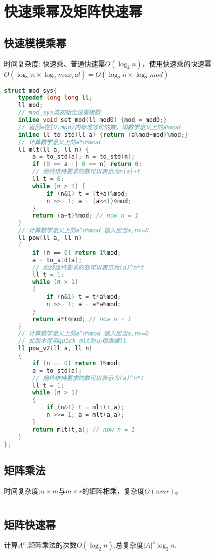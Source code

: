 \section{快速乘幂及矩阵快速幂}
    \subsection{快速模模乘幂}
        \par 时间复杂度: 快速乘、普通快速幂$O(\log_2{n})$，使用快速乘的快速幂$O(\log_2{n} \times \log_2{max_val})=O(\log_2{n} \times \log_2{mod})$
        \begin{lstlisting}[language={c++}]
struct mod_sys{
    typedef long long ll;
    ll mod;
    // mod_sys类初始化设置模数
    inline void set_mod(ll mod0) {mod = mod0;}
    // 返回a在[0,mod)内标准等价的数，即数学意义上的a%mod
    inline ll to_std(ll a) {return (a%mod+mod)%mod;}
    // 计算数学意义上的a*n%mod
    ll mlt(ll a, ll n) {
        a = to_std(a); n = to_std(n);
        if (0 == a || 0 == n) return 0;
        // 始终维持要求的数可以表示为n(a)+t
        ll t = 0;
        while (n > 1) {
            if (n&1) t = (t+a)%mod;
            n >>= 1; a = (a<<1)%mod;
        }
        return (a+t)%mod; // now n = 1
    }
    // 计算数学意义上的a^n%mod 输入应当a,n>=0
    ll pow(ll a, ll n)
    {   
        if (n == 0) return 1%mod;
        a = to_std(a);
        // 始终维持要求的数可以表示为(a)^n*t
        ll t = 1;
        while (n > 1)
        {
            if (n&1) t = t*a%mod;
            n >>= 1; a = a*a%mod;
        }
        return a*t%mod; // now n = 1
    }
    // 计算数学意义上的a^n%mod 输入应当a,n>=0
    // 此版本使用quick_mlt防止相乘爆ll
    ll pow_v2(ll a, ll n)
    {   
        if (n == 0) return 1%mod;
        a = to_std(a);
        // 始终维持要求的数可以表示为(a)^n*t
        ll t = 1;
        while (n > 1)
        {
            if (n&1) t = mlt(t,a);
            n >>= 1; a = mlt(a,a);
        }
        return mlt(t,a); // now n = 1
    }
};
        \end{lstlisting}
    \subsection{矩阵乘法}
        时间复杂度:$n \times m$与$m \times r$的矩阵相乘，复杂度$O(nmr)$。
        \begin{lstlisting}[language={c++}]
        \end{lstlisting}
    \subsection{矩阵快速幂}
        计算$A^n$.矩阵乘法的次数$O(\log_2{n})$,总复杂度$|A|^3\log_2{n}$.
        \begin{lstlisting}[language={c++}]
        \end{lstlisting}